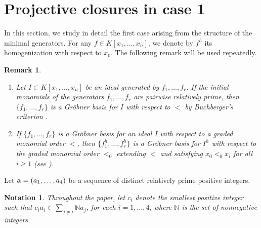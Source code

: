 \documentclass[10pt]{amsart}
\newtheorem{rem1}[thm1]{Remark}
\newtheorem{not1}[thm1]{Notation}
\begin{document}
\section{Projective closures in case 1}

In this section, we study in detail the first case arising from the structure of the minimal generators. For any $f \in K[x_1,\ldots,x_n]$, we denote by $f^{h}$ its homogenization with respect to $x_0$. The following remark will be used repeatedly.

\begin{rem1}\label{VeryBasicRemark} {\rm \begin{enumerate} \item Let $I\subset K[x_1,\ldots,x_n]$ be an ideal generated by $f_1,\ldots,f_r$. If the initial monomials of the generators
$f_1,\ldots,f_r$
are pairwise relatively prime, then $\{f_1,\ldots,f_r\}$ is a Gr\"obner basis for $I$ with respect to $<$ by Buchberger's criterion \cite[Proposition~4, Chapter~2]{CLO}. \item If $\{f_1,\ldots,f_r\}$ is a Gr\"obner basis for an ideal $I$ with respect to a graded monomial order $<$, then $\{f_1^h,\ldots,f_r^h\}$ is a Gr\"obner basis for $I^h$ with respect to the graded monomial order $<_0$ extending $<$ and satisfying $x_0<_0x_i$ for all $i\ge1$ (see \cite[Chapter~8]{CLO}). \end{enumerate} } \end{rem1}

Let ${\bf a}=(a_1,\ldots,a_4)$ be a sequence of distinct relatively prime positive integers. 
\begin{not1} {\rm Throughout the paper, let $c_i$ denote the smallest positive integer such that $c_{i}a_{i} \in \sum_{j \neq i} \mathbb{N}a_{j}$, for each $i=1,\ldots,4$, where $\mathbb{N}$ is the set of nonnegative integers.}
\end{not1}
\end{document}
